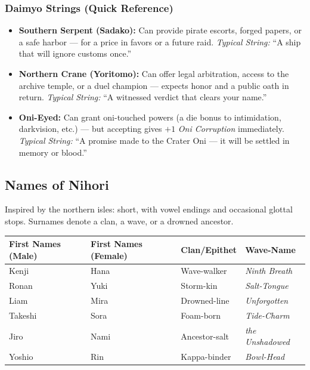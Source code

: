 \subsubsection*{Daimyo Strings (Quick Reference)}
\begin{itemize}
  \item \textbf{Southern Serpent (Sadako):} Can provide pirate escorts, forged papers, or a safe harbor --- for a price in favors or a future raid. \textit{Typical String:} ``A ship that will ignore customs once.''
  \item \textbf{Northern Crane (Yoritomo):} Can offer legal arbitration, access to the archive temple, or a duel champion --- expects honor and a public oath in return. \textit{Typical String:} ``A witnessed verdict that clears your name.''
  \item \textbf{Oni-Eyed:} Can grant oni-touched powers (a die bonus to intimidation, darkvision, etc.) --- but accepting gives $+1$ \textit{Oni Corruption} immediately. \textit{Typical String:} ``A promise made to the Crater Oni --- it will be settled in memory or blood.''
\end{itemize}

\subsection*{Names of Nihori}
\label{sec:nihori-names}

Inspired by the northern isles: short, with vowel endings and occasional glottal stops. Surnames denote a clan, a wave, or a drowned ancestor.

\begin{longtable}{|p{}|p{}|p{}|p{}|}
\hline
\textbf{First Names (Male)} & \textbf{First Names (Female)} & \textbf{Clan/Epithet} & \textbf{Wave-Name} \\
\hline
Kenji & Hana & Wave-walker & \textit{Ninth Breath} \\
\hline
Ronan & Yuki & Storm-kin & \textit{Salt-Tongue} \\
\hline
Liam & Mira & Drowned-line & \textit{Unforgotten} \\
\hline
Takeshi & Sora & Foam-born & \textit{Tide-Charm} \\
\hline
Jiro & Nami & Ancestor-salt & \textit{the Unshadowed} \\
\hline
Yoshio & Rin & Kappa-binder & \textit{Bowl-Head} \\
\hline
\end{longtable}

